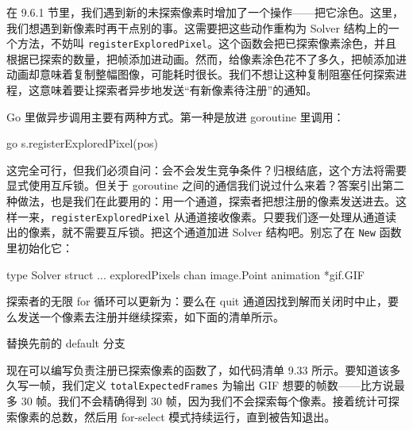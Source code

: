 在 9.6.1 节里，我们遇到新的未探索像素时增加了一个操作——把它涂色。这里，我们想遇到新像素时再干点别的事。这需要把这些动作重构为 Solver 结构上的一个方法，不妨叫 \texttt{registerExploredPixel}。这个函数会把已探索像素涂色，并且根据已探索的数量，把帧添加进动画。然而，给像素涂色花不了多久，把帧添加进动画却意味着复制整幅图像，可能耗时很长。我们不想让这种复制阻塞任何探索进程，这意味着要让探索者异步地发送``有新像素待注册''的通知。

Go 里做异步调用主要有两种方式。第一种是放进 goroutine 里调用：

\begin{gocode}[]
go s.registerExploredPixel(pos)
\end{gocode}

这完全可行，但我们必须自问：会不会发生竞争条件？归根结底，这个方法将需要显式使用互斥锁。但关于 goroutine 之间的通信我们说过什么来着？答案引出第二种做法，也是我们在此要用的：用一个通道，探索者把想注册的像素发送进去。这样一来，\texttt{registerExploredPixel} 从通道接收像素。只要我们逐一处理从通道读出的像素，就不需要互斥锁。把这个通道加进 Solver 结构吧。别忘了在 \texttt{New} 函数里初始化它：

\begin{gocode}[]
type Solver struct {
    ...
    exploredPixels chan image.Point
    animation      *gif.GIF
}
\end{gocode}

探索者的无限 for 循环可以更新为：要么在 quit 通道因找到解而关闭时中止，要么发送一个像素去注册并继续探索，如下面的清单所示。


\begin{codeannotations}
\item 替换先前的 default 分支
\end{codeannotations}

现在可以编写负责注册已探索像素的函数了，如代码清单 9.33 所示。要知道该多久写一帧，我们定义 \texttt{totalExpected­Frames} 为输出 GIF 想要的帧数——比方说最多 30 帧。我们不会精确得到 30 帧，因为我们不会探索每个像素。接着统计可探索像素的总数，然后用 for-select 模式持续运行，直到被告知退出。

